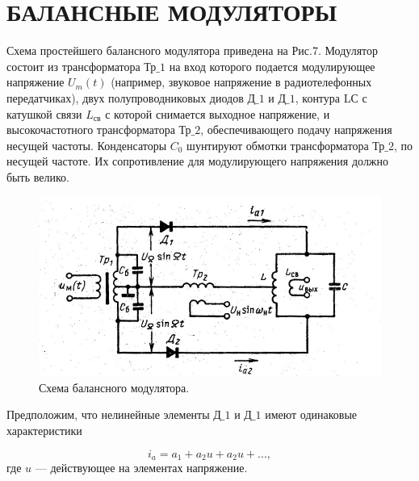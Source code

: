 \section{БАЛАНСНЫЕ МОДУЛЯТОРЫ}

Схема простейшего балансного модулятора приведена на Рис.7. Модулятор состоит из трансформатора $\text{Тр_1}$ на вход которого подается модулирующее напряжение $U_m(t)$ (например, звуковое напряжение в радиотелефонных передатчиках), двух полупроводниковых диодов $\text{Д_1}$ и $\text{Д_1}$, контура LС с катушкой связи $L_{\text{св}}$ с которой снимается выходное напряжение, и высокочастотного трансформатора $\text{Тр_2}$, обеспечивающего подачу напряжения несущей частоты. Конденсаторы $C_0$ шунтируют обмотки трансформатора $\text{Тр_2}$, по несущей частоте. Их сопротивление для модулирующего напряжения должно быть велико. 

\begin{figure}[h!]
	\centering
	\includegraphics[width=0.8\linewidth]{fig/fig7}
	\caption{Схема балансного модулятора.}
	\label{fig:fig7}
\end{figure}

Предположим, что нелинейные элементы $\text{Д_1}$ и $\text{Д_1}$ имеют одинаковые
характеристики

$$i_a = a_1 + a_2u + a_2u+...,$$ 
где $u$ — действующее на элементах напряжение. 

